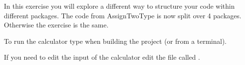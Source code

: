 In this exercise you will explore a different way to structure your code
within different packages. The code from AssignTwoType is now split over 4 packages.
Otherwise the exercise is the same.

To run the calculator type  when building the project (or  from a terminal).

If you need to edit the input of the calculator edit the file called .

